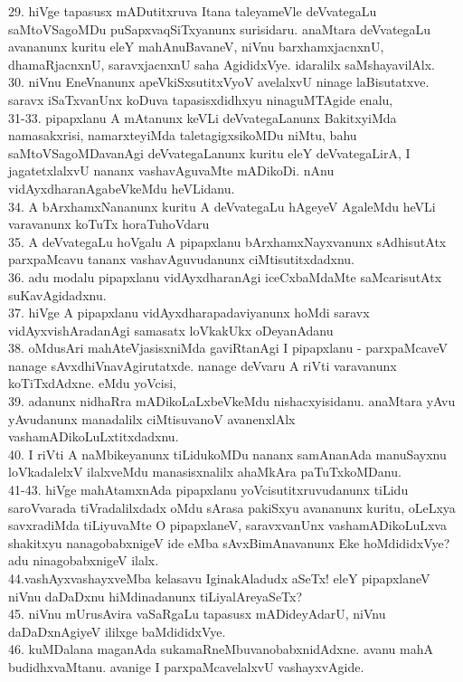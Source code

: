 \documentclass{article}
\begin{document}
29. hiVge tapasusx mADutitxruva Itana taleyameVle deVvategaLu saMtoVSagoMDu puSapxvaqSiTxyanunx surisidaru. anaMtara deVvategaLu avananunx kuritu eleY mahAnuBavaneV, niVnu barxhamxjacnxnU, dhamaRjacnxnU, saravxjacnxnU saha AgididxVye. idaralilx saMshayavilAlx.\\
30. niVnu EneVnanunx apeVkiSxsutitxVyoV avelalxvU ninage laBisutatxve. saravx iSaTxvanUnx koDuva tapasisxdidhxyu ninaguMTAgide enalu,\\
31-33. pipapxlanu A mAtanunx keVLi deVvategaLanunx BakitxyiMda namasakxrisi, namarxteyiMda taletagigxsikoMDu niMtu, bahu saMtoVSagoMDavanAgi deVvategaLanunx kuritu eleY deVvategaLirA, I jagatetxlalxvU nananx vashavAguvaMte mADikoDi. nAnu vidAyxdharanAgabeVkeMdu heVLidanu.\\
34. A bArxhamxNananunx kuritu A deVvategaLu hAgeyeV AgaleMdu heVLi varavanunx koTuTx horaTuhoVdaru\\
35. A deVvategaLu hoVgalu A pipapxlanu bArxhamxNayxvanunx sAdhisutAtx parxpaMcavu tananx vashavAguvudanunx ciMtisutitxdadxnu.\\
36. adu modalu pipapxlanu vidAyxdharanAgi iceCxbaMdaMte saMcarisutAtx suKavAgidadxnu.\\
37. hiVge A pipapxlanu vidAyxdharapadaviyanunx hoMdi saravx vidAyxvishAradanAgi samasatx loVkakUkx oDeyanAdanu\\
38. oMdusAri mahAteVjasisxniMda gaviRtanAgi I pipapxlanu - parxpaMcaveV nanage sAvxdhiVnavAgirutatxde. nanage deVvaru A riVti varavanunx koTiTxdAdxne. eMdu yoVcisi,\\
39. adanunx nidhaRra mADikoLaLxbeVkeMdu nishacxyisidanu. anaMtara yAvu yAvudanunx manadalilx ciMtisuvanoV avanenxlAlx vashamADikoLuLxtitxdadxnu.\\
40. I riVti A naMbikeyanunx tiLidukoMDu nananx samAnanAda manuSayxnu loVkadalelxV ilalxveMdu manasisxnalilx ahaMkAra paTuTxkoMDanu.\\
41-43. hiVge mahAtamxnAda pipapxlanu yoVcisutitxruvudanunx tiLidu saroVvarada tiVradalilxdadx oMdu sArasa pakiSxyu avananunx kuritu, oLeLxya savxradiMda tiLiyuvaMte O pipapxlaneV, saravxvanUnx vashamADikoLuLxva shakitxyu nanagobabxnigeV ide eMba sAvxBimAnavanunx Eke hoMdididxVye? adu ninagobabxnigeV ilalx.\\
44.vashAyxvashayxveMba kelasavu IginakAladudx aSeTx! eleY pipapxlaneV niVnu daDaDxnu hiMdinadanunx tiLiyalAreyaSeTx?\\
45. niVnu mUrusAvira vaSaRgaLu tapasusx mADideyAdarU, niVnu daDaDxnAgiyeV ililxge baMdididxVye.\\
46. kuMDalana maganAda sukamaRneMbuvanobabxnidAdxne. avanu mahA budidhxvaMtanu. avanige I parxpaMcavelalxvU vashayxvAgide.\\
\end{document}
